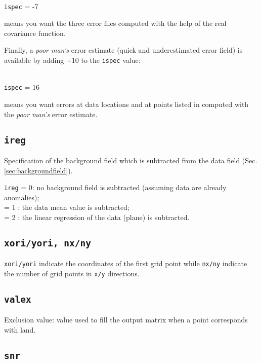 \example\\
\texttt{ispec}             = -7 \qquad \begin{minipage}[t]{.7\textwidth}{means you want the three error files computed with the help of the real covariance function.}\end{minipage}


Finally, a \textit{poor man's} error estimate (quick and underestimated error field) is available by adding $+10$ to the \texttt{ispec} value:

\example\\
\texttt{ispec}             = 16 \qquad \begin{minipage}[t]{.7\textwidth}{means you want errors at data locations and at points listed in  computed with the \textit{poor man's} error estimate.}\end{minipage}


\subsection{\texttt{ireg}}

Specification of the background field which is subtracted from the data field (Sec. \ref{sec:backgroundfield}).

\texttt{ireg}             = 0\qquad: no background field is subtracted (assuming data are already anomalies); \\
  = 1 \qquad: the data mean value is subtracted;\\
  = 2 \qquad: the linear regression of the data (plane) is subtracted.

\subsection{\texttt{xori/yori, nx/ny}}

\texttt{xori/yori} indicate the coordinates of the first grid point while \texttt{nx/ny} indicate the number of grid points in \texttt{x/y} directions.



\subsection{\texttt{valex}}

Exclusion value: value used to fill the output matrix when a point corresponds with land.


\subsection{\texttt{snr}}

